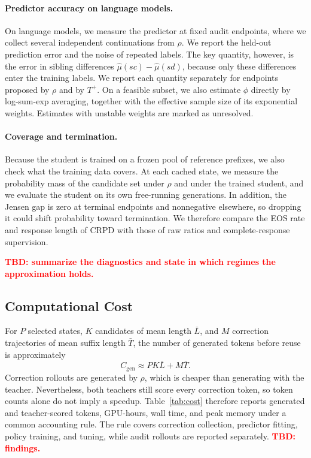 \documentclass[pdflatex,sn-mathphys-num,review]{sn-jnl}
\theoremstyle{thmstyleone}
\theoremstyle{thmstyletwo}
\theoremstyle{thmstylethree}
\providecommand{\Tp}{T^{+}}
\providecommand{\muhat}{\widehat{\mu}}
\newcommand{\tbd}[1][]{\textcolor{red}{\textbf{TBD#1}}}
\begin{document}
\paragraph{Predictor accuracy on language models.}
On language models, we measure the predictor at fixed audit endpoints, where we collect several independent continuations from $\rho$. We report the held-out prediction error and the noise of repeated labels. The key quantity, however, is the error in sibling differences $\muhat(sc)-\muhat(sd)$, because only these differences enter the training labels. We report each quantity separately for endpoints proposed by $\rho$ and by $\Tp$. On a feasible subset, we also estimate $\phi$ directly by log-sum-exp averaging, together with the effective sample size of its exponential weights. Estimates with unstable weights are marked as unresolved.

\paragraph{Coverage and termination.}
Because the student is trained on a frozen pool of reference prefixes, we also check what the training data covers. At each cached state, we measure the probability mass of the candidate set under $\rho$ and under the trained student, and we evaluate the student on its own free-running generations. In addition, the Jensen gap is zero at terminal endpoints and nonnegative elsewhere, so dropping it could shift probability toward termination. We therefore compare the EOS rate and response length of CRPD with those of raw ratios and complete-response supervision.

\tbd[: summarize the diagnostics and state in which regimes the approximation holds.]

\subsection{Computational Cost}
\label{subsec:cost}

For $P$ selected states, $K$ candidates of mean length $\bar L$, and $M$ correction trajectories of mean suffix length $\bar T$, the number of generated tokens before reuse is approximately
\begin{equation}
C_{\mathrm{gen}}\approx PK\bar L+M\bar T.
\label{eq:cost}
\end{equation}
Correction rollouts are generated by $\rho$, which is cheaper than generating with the teacher. Nevertheless, both teachers still score every correction token, so token counts alone do not imply a speedup. Table~\ref{tab:cost} therefore reports generated and teacher-scored tokens, GPU-hours, wall time, and peak memory under a common accounting rule. The rule covers correction collection, predictor fitting, policy training, and tuning, while audit rollouts are reported separately. \tbd[: findings.]
\end{document}
